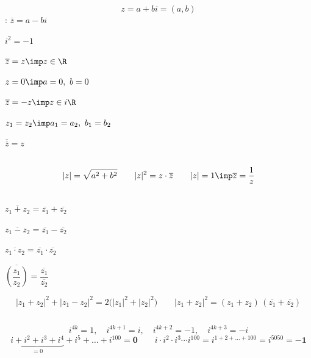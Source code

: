 
\[
z=a+bi=(a,b)
\]
: $\overline{z}=a-bi$

\begin{formulae}
\item $i^2=-1$
\item $\overline{z}=z\imp z\in\R$
\item $z=0\imp a=0,\ b=0$
\item $\overline{z}=-z\imp z\in i\R$
\item $z_1=z_2\imp a_1=a_2,\ b_1=b_2$
\item $\overline{\overline{z}}=z$
\end{formulae}

\subsection{}
\[
|z|=\sqrt{a^2+b^2}\qquad |z|^2=z\cdot\overline{z}\qquad |z|=1\imp\overline{z}=\frac1z
\]

\subsection{}
\begin{formulae}
\item $\overline{z_1+z_2}=\overline{z_1}+\overline{z_2}$
\item $\overline{z_1-z_2}=\overline{z_1}-\overline{z_2}$
\item $\overline{z_1\cdot z_2}=\overline{z_1}\cdot\overline{z_2}$
\item $\overline{\left(\dfrac{z_1}{z_2}\right)}=\dfrac{\overline{z_1}}{\overline{z_2}}$
\end{formulae}
\[
|z_1+z_2|^2+|z_1-z_2|^2=2\bigl(|z_1|^2+|z_2|^2\bigr)
\qquad
|z_1+z_2|^2=(z_1+z_2)\,(\overline{z_1}+\overline{z_2})
\]

\subsection{}
\[
i^{4k}=1,\quad i^{4k+1}=i,\quad i^{4k+2}=-1,\quad i^{4k+3}=-i
\]
\[
\underbrace{i+i^2+i^3+i^4}_{=0}+i^5+\dots+i^{100}=\mathbf{0}
\qquad
i\cdot i^2\cdot i^3\cdots i^{100}=i^{1+2+\dots+100}=i^{5050}=\mathbf{-1}
\]

